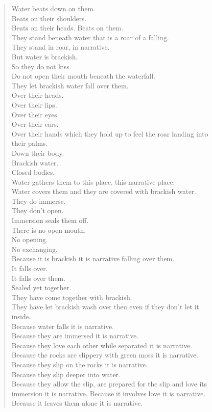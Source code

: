 \documentclass[
]{memoir}
\begin{document}
\begin{verse}
Water beats down on them.\\
Beats on their shoulders.\\
Beats on their heads. Beats on them.\\
They stand beneath water that is a roar of a falling.\\
They stand in roar, in narrative.\\
But water is brackish.\\
So they do not kiss.\\
Do not open their mouth beneath the waterfall.\\
They let brackish water fall over them.\\
Over their heads.\\
Over their lips.\\
Over their eyes.\\
Over their ears.\\
Over their hands which they hold up to feel the roar landing into\\
their palms.\\
Down their body.\\
Brackish water.\\
Closed bodies.\\
Water gathers them to this place, this narrative place.\\
Water covers them and they are covered with brackish water.\\
They do immerse.\\
They don’t open.\\
Immersion seals them off.\\
There is no open mouth.\\
No opening.\\
No exchanging.\\
Because it is brackish it is narrative falling over them.\\
It falls over.\\
It falls over them.\\
Sealed yet together.\\
They have come together with brackish.\\
They have let brackish wash over then even if they don’t let it\\
inside.\\
Because water falls it is narrative.\\
Because they are immersed it is narrative.\\
Because they love each other while separated it is narrative.\\
Because the rocks are slippery with green moss it is narrative.\\
Because they slip on the rocks it is narrative.\\
Because they slip deeper into water.\\
Because they allow the slip, are prepared for the slip and love its\\
immersion it is narrative. Because it involves love it is narrative.\\
Because it leaves them alone it is narrative.\\
\end{verse}
\end{document}
